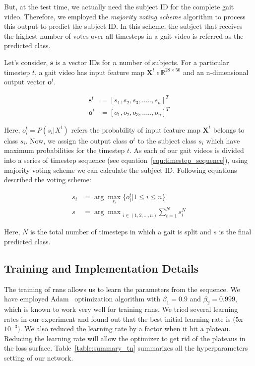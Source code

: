 But, at the test time, we actually need the subject ID for the complete gait video. Therefore, we employed the \textit {majority voting scheme} algorithm to process this output to predict the subject ID. In this scheme, the subject that receives the highest number of votes over all timesteps in a  gait video is referred as the predicted class.

Let's consider, $\boldsymbol{s}$ is a vector IDs for $n$ number of subjects. For a particular timestep $t$, a gait video has input feature map $\boldsymbol X^t~\epsilon~\mathbb {R}^{28\times 50}$ and an n-dimensional output vector $\boldsymbol o^t$.

\begin{equation} \label{equ:timestep_sequence}
\begin{split}
\boldsymbol s^t &=  {[s_1, s_2, s_3, ....., s_{n}]}^{T}\\
\boldsymbol o^t &=  {[o_1, o_2, o_3, ....., o_{n}]}^{T}
\end{split}
\end{equation}

Here, $o_i^t = P(s_i | X^t)$ refers the probability of input feature map $\boldsymbol X^t$ belongs to class $s_i$. Now, we assign the output class $\mathbf{o}^t$ to the subject class $s_i$ which have maximum probabilities for the timestep $t$. As each of our gait videos is divided into a series of timestep sequence (see equation~\ref{equ:timestep_sequence}), using majority voting scheme we can calculate the subject ID. Following equations described the voting scheme:

\begin{equation}
\label{equ:predicted_class}
\begin{split}
s_t &=  \arg\max_{s_i}{\{o_i^t | 1 \leq i \leq n\}} \\
s &= {\arg\max}_{i\in(1, 2, ...,n)}{\sum_{t=1}^{N}s_i^N}
\end{split}
\end{equation}

Here, $ N $ is the total number of timesteps in which a gait is split and $ s $ is the final predicted class.  


\subsection{Training and Implementation Details}
The training of \gls{rnn}s allows us to learn the parameters from the sequence. We have employed Adam~\cite{Kingma_15} optimization algorithm with $\beta_1 = 0.9$ and $\beta_2 = 0.999$, which is known to work very well for training \gls{rnn}s. We tried several learning rates in our experiment and found out that the best initial learning rate is $(5$x$10^{-3})$. We also reduced the learning rate by a factor when it hit a plateau. Reducing the learning rate will allow the optimizer to get rid of the plateaus in the loss surface. Table~\ref{table:summary_tn} summarizes all the hyperparameters setting of our network.


